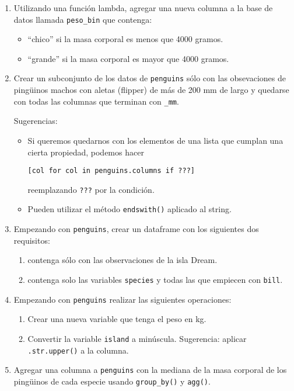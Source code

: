 \documentclass[a4paper,11pt]{article}
\theoremstyle{definition}
\begin{document}
\begin{enumerate}
\item Utilizando una función lambda, agregar una nueva columna a la base de datos llamada \lstinline{peso_bin} que contenga:
\begin{itemize}
\item ``chico'' si la masa corporal es menos que 4000 gramos.
\item ``grande'' si la masa corporal es mayor que 4000 gramos.
\end{itemize}

\item
Crear un subconjunto de los datos de \lstinline{penguins} sólo con las obsevaciones de ping\"uinos machos con aletas (flipper) de más de 200 mm de largo y quedarse con todas las columnas que terminan con \lstinline{_mm}.

Sugerencias:
\begin{itemize}
\item Si queremos quedarnos con los elementos de una lista que cumplan una cierta propiedad, podemos hacer

\lstinline{[col for col in penguins.columns if ???]}

reemplazando \lstinline{???} por la condición.
\item Pueden utilizar el método \lstinline{endswith()} aplicado al string.
\end{itemize}

\item Empezando con \lstinline{penguins}, crear un dataframe con los siguientes dos requisitos:
\begin{enumerate}
\item contenga sólo con las observaciones de la isla Dream.
\item contenga solo las variables \lstinline{species} y todas las que empiecen con \lstinline{bill}.
\end{enumerate}


\item Empezando con \lstinline{penguins} realizar las siguientes operaciones:
\begin{enumerate}
\item Crear una nueva variable que tenga el peso en kg.
\item Convertir la variable \lstinline{island} a minúscula. Sugerencia: aplicar \lstinline{.str.upper()} a la columna.
\end{enumerate}

\item Agregar una columna a \lstinline{penguins} con la mediana de la masa corporal de los ping\"uinos de cada especie usando \lstinline{group_by()} y \lstinline{agg()}.


\end{enumerate}
\end{document}
